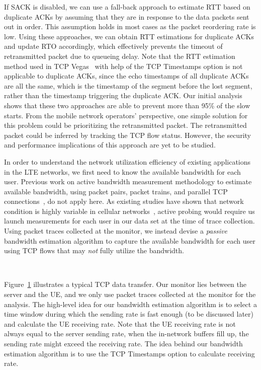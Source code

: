 If SACK is disabled, we can use a fall-back approach to estimate RTT based on duplicate ACKs by assuming that they are in response to the data packets sent out in order. This assumption holds in most cases as the packet reordering rate is low. Using these approaches, we can obtain RTT estimations for duplicate ACKs and update RTO accordingly, which effectively prevents the timeout of retransmitted packet due to queueing delay. Note that the RTT estimation method used in TCP Vegas~\cite{tcp.vegas} with help of the TCP Timestamps option is not applicable to duplicate ACKs, since the echo timestamps of all duplicate ACKs are all the same, which is the timestamp of the segment before the lost segment, rather than the timestamp triggering the duplicate ACK. Our initial analysis shows that these two approaches are able to prevent more than 95\% of the slow starts. From the mobile network operators' perspective, one simple solution for this problem could be prioritizing the retransmitted packet. The retransmitted packet could be inferred by tracking the TCP flow status. However, the security and performance implications of this approach are yet to be studied.

\label{sec:tcp.estimate}

In order to understand the network utilization efficiency of existing applications in the LTE networks, we first need to know the available bandwidth for each user. Previous work on active bandwidth measurement methodology to estimate available bandwidth, \eg using packet pairs, packet trains, and parallel TCP connections~\cite{prasad03, jain02, hu04}, do not apply here. As existing studies have shown that network condition is highly variable in cellular networks~\cite{mobisys.3gtest}, active probing would require us launch measurements for each user in our data set at the time of trace collection. Using packet traces collected at the monitor, we instead devise a \emph{passive} bandwidth estimation algorithm to capture the available bandwidth for each user using TCP flows that may \emph{not} fully utilize the bandwidth.

\label{sec:tcp.estimation}

\begin{figure}[t]
\centering
{}\\
\label{fig:algo}
\end{figure}

Figure~\ref{fig:algo} illustrates a typical TCP data transfer. Our monitor lies between the server and the UE, and we only use packet traces collected at the monitor for the analysis. The high-level idea for our bandwidth estimation algorithm is to select a time window during which the sending rate is fast enough (to be discussed later) and calculate the UE receiving rate. Note that the UE receiving rate is not always equal to the server sending rate, \eg when the in-network buffers fill up, the sending rate might exceed the receiving rate. The idea behind our bandwidth estimation algorithm is to use the TCP Timestamps option to calculate receiving rate.


